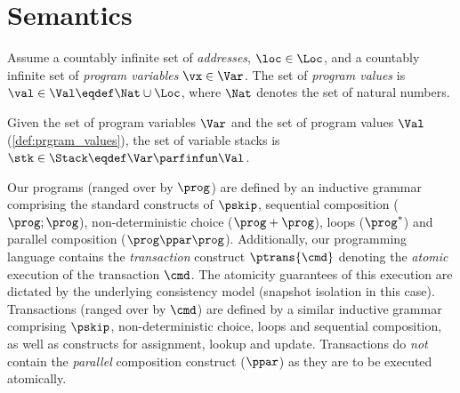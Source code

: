 \section{Semantics\label{sec:semantics}}
\begin{definition}\label{def:prgram_values}
Assume a countably infinite set of \emph{addresses}, $\loc \in \Loc$, and a countably infinite set of \emph{program variables} $\vx \in {\Var}$. The set of \emph{program values} is $\val \in \Val \eqdef \Nat \cup \Loc$, where $\Nat$ denotes the set of natural numbers.
\end{definition}
%
%
\begin{definition}[Stacks]\label{def:stacks}
Given the set of program variables $\Var$ and the set of program values $\Val$ (\ref{def:prgram_values}), the set of variable stacks is $\stk \in \Stack \eqdef \Var \parfinfun \Val$.
\end{definition}
%
%
Our programs (ranged over by $\prog$) are defined by an inductive grammar comprising the standard constructs of $\pskip$, sequential composition ($\prog; \prog$), non-deterministic choice ($\prog+\prog$), loops ($\prog^*$) and parallel composition ($\prog \ppar \prog$). Additionally, our programming language contains the \emph{transaction} construct $\ptrans{\cmd}$ denoting the \emph{atomic} execution of the transaction $\cmd$. The atomicity guarantees of this execution are dictated by the underlying consistency model (snapshot isolation in this case).
Transactions (ranged over by $\cmd$) are defined by a similar inductive grammar comprising $\pskip$, non-deterministic choice, loops and sequential composition, as well as constructs for assignment, lookup and update. Transactions do \emph{not} contain the \emph{parallel} composition construct ($\ppar$) as they are to be executed atomically.

